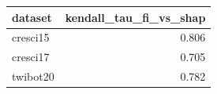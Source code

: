 \begin{tabular}{lr}
\toprule
dataset & kendall_tau_fi_vs_shap \\
\midrule
cresci15 & 0.806 \\
cresci17 & 0.705 \\
twibot20 & 0.782 \\
\bottomrule
\end{tabular}
